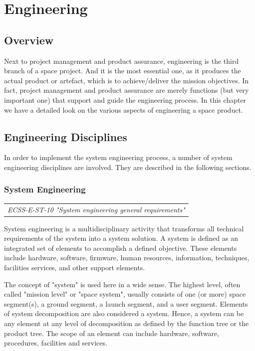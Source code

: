 \chapter{Engineering}

\section{Overview}

Next to project management and product assurance, engineering is the third branch of a space project. And it is the most essential one, as it produces the actual product or artefact, which is to achieve/deliver the mission objectives. In fact, project management and product assurance are merely functions (but very important one) that support and guide the engineering process. In this chapter we have a detailed look on the various aspects of engineering a space product.

\section{Engineering Disciplines}

In order to implement the system engineering process, a number of system engineering disciplines are involved. They are described in the following sections.

\subsection{System Engineering}
\label{sec:System Engineering}

\begin{tabular}{l}
\textit{ECSS-E-ST-10 "System engineering general requirements" \cite{ECSS-E-ST-10}}
\end{tabular}

System engineering is a multidisciplinary activity that transforms all technical requirements of the system into a system solution. A system is defined as an integrated set of elements to accomplish a defined objective. These elements include hardware, software, firmware, human resources, information, techniques, facilities services, and other support elements.

The concept of "system" is used here in a wide sense. The highest level, often called "mission level" or "space system", usually consists of one (or more) space segment(s), a ground segment, a launch segment, and a user segment. Elements of system decomposition are also considered a system. Hence, a system can be any element at any level of decomposition as defined by the function tree or the product tree. The scope of an element can include hardware, software, procedures, facilities and services.


